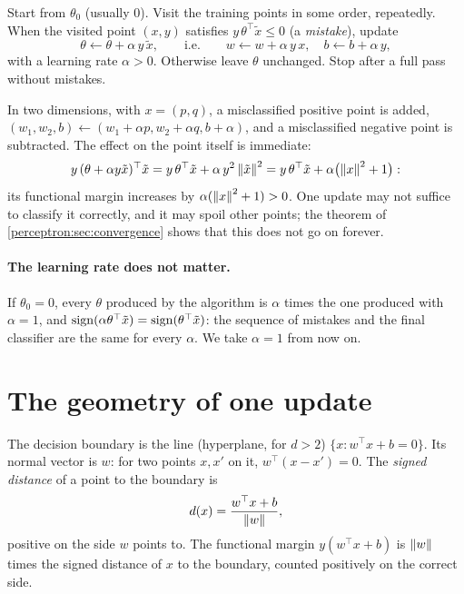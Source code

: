 \begin{notechapter}
\begin{definition}[Perceptron]\label{perceptron:def:rule}
Start from $\theta_0$ (usually $0$). Visit the training points in some order, repeatedly.
When the visited point $(x, y)$ satisfies $y\,\theta^\top\tilde x\leq0$ (a \emph{mistake}), update
\[
  \theta\leftarrow\theta + \alpha\,y\,\tilde x,\qquad\text{i.e.}\qquad
  w\leftarrow w + \alpha\,y\,x,\quad b\leftarrow b + \alpha\,y,
\]
with a learning rate $\alpha>0$. Otherwise leave $\theta$ unchanged. Stop after a full pass without
mistakes.
\end{definition}

In two dimensions, with $x = (p, q)$, a misclassified positive point is added,
$(w_1, w_2, b)\leftarrow(w_1 + \alpha p, w_2 + \alpha q, b + \alpha)$, and a misclassified negative point is
subtracted. The effect on the point itself is immediate:
\[
  y\,(\theta + \alpha y\tilde x)^\top\tilde x = y\,\theta^\top\tilde x + \alpha\,y^2\left\|\tilde x\right\|^2 = y\,\theta^\top\tilde x + \alpha\bigl(\left\|x\right\|^2 + 1\bigr):
\]
its functional margin increases by $\alpha(\left\|x\right\|^2 + 1)>0$. One update may not suffice to
classify it correctly, and it may spoil other points; the theorem of
\cref{perceptron:sec:convergence} shows that this does not go on forever.

\paragraph{The learning rate does not matter.} If $\theta_0 = 0$, every $\theta$ produced by the
algorithm is $\alpha$ times the one produced with $\alpha = 1$, and $\operatorname{sign}(\alpha\theta^\top\tilde x) = \operatorname{sign}(\theta^\top\tilde x)$:
the sequence of mistakes and the final classifier are the same for every $\alpha$. We
take $\alpha = 1$ from now on.

\section{The geometry of one update}\label{perceptron:sec:geometry}

The decision boundary is the line (hyperplane, for $d>2$) $\{x : w^\top x + b = 0\}$. Its
normal vector is $w$: for two points $x, x'$ on it, $w^\top(x - x') = 0$. The \emph{signed distance}
of a point to the boundary is
\[
  d(x) = \frac{w^\top x + b}{\left\|w\right\|},
\]
positive on the side $w$ points to. The functional margin $y(w^\top x + b)$ is $\left\|w\right\|$ times the
signed distance of $x$ to the boundary, counted positively on the correct side.


\end{notechapter}
